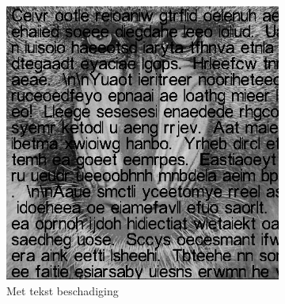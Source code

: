 





















\FloatBarrier

\begin{figure}
    \centering
    \begin{subfigure}[b]{0.45\textwidth}
        \includegraphics[width=\textwidth]{../src/inpainting/baboon_broke}
        \caption{Met tekst beschadiging}
        \label{fig:tiger}
    \end{subfigure}
    ~ %
    \begin{subfigure}[b]{0.45\textwidth}

\end{subfigure}
\end{figure}
